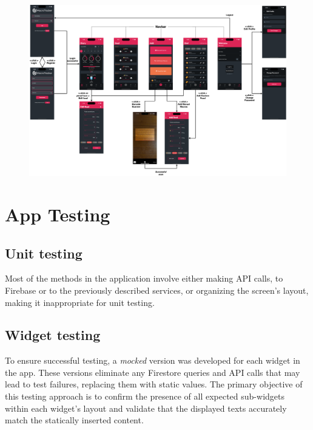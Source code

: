 \documentclass{Configuration_Files/PoliMi3i_thesis}
\begin{document}
\begin{figure}[!h]
  \centering
  \includegraphics[scale=0.18]{Images/UX.png}
\end{figure}


\chapter{App Testing}
\section{Unit testing}
Most of the methods in the application involve either making API calls, to Firebase or to the previously described services, or organizing the screen's layout, making it inappropriate for unit testing.
\section{Widget testing}
To ensure successful testing, a \textit{mocked} version was developed for each widget in the app. These versions eliminate any Firestore queries and API calls that may lead to test failures, replacing them with static values. The primary objective of this testing approach is to confirm the presence of all expected sub-widgets within each widget's layout and validate that the displayed texts accurately match the statically inserted content.
\end{document}
